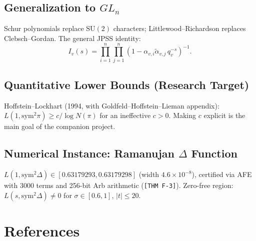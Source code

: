\documentclass[12pt]{article}
\begin{document}
\subsection{Generalization to $GL_n$}

Schur polynomials replace $\mathrm{SU}(2)$ characters; Littlewood--Richardson replaces
Clebsch--Gordan. The general JPSS identity:
\[
  I_v(s) = \prod_{i=1}^n\prod_{j=1}^n (1-\alpha_{v,i}\tilde\alpha_{v,j}\,q_v^{-s})^{-1}.
\]

\subsection{Quantitative Lower Bounds (Research Target)}

Hoffstein--Lockhart (1994, with Goldfeld--Hoffstein--Lieman appendix):
$L(1,\mathrm{sym}^2\pi) \geq c/\log N(\pi)$ for an ineffective $c>0$.
Making $c$ explicit is the main goal of the companion project.

\subsection{Numerical Instance: Ramanujan $\Delta$ Function}

$L(1,\mathrm{sym}^2\Delta) \in [0.63179293, 0.63179298]$ (width $4.6\times10^{-8}$),
certified via AFE with 3000 terms and 256-bit Arb arithmetic (\texttt{[THM F-3]}).
Zero-free region: $L(s,\mathrm{sym}^2\Delta) \neq 0$ for $\sigma \in [0.6, 1]$, $|t| \leq 20$.

\section*{References}
\end{document}
